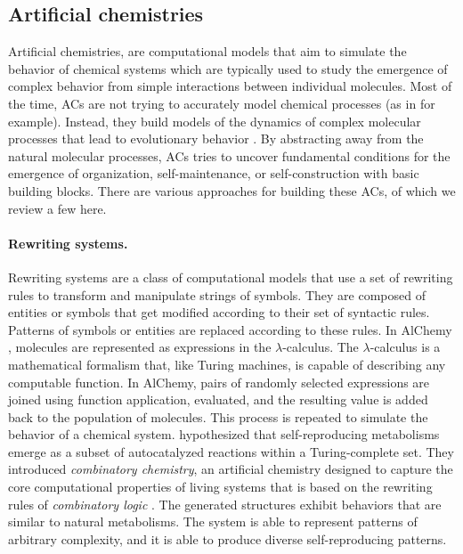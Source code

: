\subsection{Artificial chemistries}
Artificial chemistries, are computational models that aim to simulate the
behavior of chemical systems which are typically used to study the emergence of
complex behavior from simple interactions between individual molecules. Most of
the time, \acp{AC} are not trying to accurately model chemical processes (as in
\parencite{ostrovskyCellularAutomataPolymer2001,
  buligaChemlambdaUniversalitySelfmultiplication2014,
  bedauLessAbstractArtificial2000, sayamaSeekingOpenendedEvolution2011} for
example). Instead, they build models of the dynamics of complex molecular
processes that lead to evolutionary behavior
\parencite{dittrichArtificialChemistriesReview2001}. By abstracting away from
the natural molecular processes, \acp{AC} tries to uncover fundamental
conditions for the emergence of organization, self-maintenance, or
self-construction with basic building blocks. There are various approaches for
building these \aclp{AC}, of which we review a few here.

\paragraph{Rewriting systems.}
Rewriting systems are a class of computational models that use a set of
rewriting rules to transform and manipulate strings of symbols. They are
composed of entities or symbols that get modified according to their set of
syntactic rules. Patterns of symbols or entities are replaced according to these
rules. In AlChemy \parencite{fontanaWhatWouldBe1994}, molecules are represented
as expressions in the $\lambda$-calculus. The $\lambda$-calculus is a mathematical formalism
that, like Turing machines, is capable of describing any computable function. In
AlChemy, pairs of randomly selected expressions are joined using function
application, evaluated, and the resulting value is added back to the population
of molecules. This process is repeated to simulate the behavior of a chemical
system. \textcite{kruszewskiEmergenceSelfReproducingMetabolisms2022}
hypothesized that self-reproducing metabolisms emerge as a subset of
autocatalyzed reactions within a Turing-complete set. They introduced
\emph{combinatory chemistry}, an artificial chemistry designed to capture the
core computational properties of living systems that is based on the rewriting
rules of \emph{combinatory logic} \parencite{curryCombinatoryLogic1958,
  schoenfinkelUeberBausteineMathematischen1924}. The generated structures
exhibit behaviors that are similar to natural metabolisms. The system is able to
represent patterns of arbitrary complexity, and it is able to produce diverse
self-reproducing patterns.

